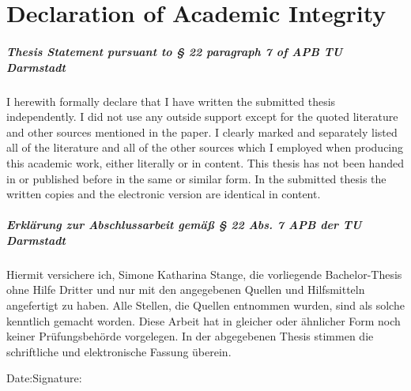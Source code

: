 	\chapter*{Declaration of Academic Integrity}
	\vspace{11pt}
	\paragraph{Thesis Statement pursuant to § 22 paragraph 7 of APB TU Darmstadt}
	\vspace{11pt}
	\noindent I herewith formally declare that I have written the submitted thesis independently. I did not use any outside support except for the quoted literature and other sources mentioned in the paper. I clearly marked and separately listed all of the literature and all of the other sources which I employed when producing this academic work, either literally or in content. This thesis has not been handed in or published before in the same or similar form.\newline
	In the submitted thesis the written copies and the electronic version are identical in content.
	
	\paragraph{Erklärung zur Abschlussarbeit gemäß § 22 Abs. 7 APB der TU Darmstadt}
	\vspace{11pt}
	\noindent Hiermit versichere ich, Simone Katharina Stange, die vorliegende Bachelor-Thesis ohne Hilfe Dritter und nur mit den angegebenen Quellen und Hilfsmitteln angefertigt zu haben. Alle Stellen, die Quellen entnommen wurden, sind als solche kenntlich gemacht worden. Diese Arbeit hat in gleicher oder ähnlicher Form noch keiner Prüfungsbehörde vorgelegen. \newline
	In der abgegebenen Thesis stimmen die schriftliche und elektronische Fassung überein.\vspace{40pt}
	
	\noindent Date:\hspace{0.4\textwidth}Signature:
	\vspace*{2cm}